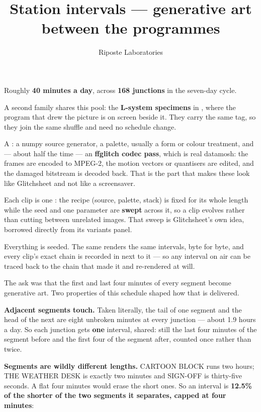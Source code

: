 \documentclass[fontpath=fonts/,logopath=logo/]{riposte-doc}
\title{Station intervals — generative art between the programmes}
\author{Riposte Laboratories}
\date{}
\begin{document}
\ripmakehead

\riptoc

Roughly \textbf{40 minutes a day}, across \textbf{168 junctions} in the seven-day cycle.

A second family shares this pool: the \textbf{L-system specimens} in , where the program that drew the picture is on screen beside it. They carry the same  tag, so they join the same shuffle and need no schedule change.



A : a numpy source generator, a palette, usually a form or colour treatment, and — about half the time — an \textbf{ffglitch codec pass}, which is real datamosh: the frames are encoded to MPEG-2, the motion vectors or quantisers are edited, and the damaged bitstream is decoded back. That is the part that makes these look like Glitchsheet and not like a screensaver.

Each clip is one : the recipe (source, palette, stack) is fixed for its whole length while the seed and one parameter are \textbf{swept} across it, so a clip evolves rather than cutting between unrelated images. That sweep is Glitchsheet's own idea, borrowed directly from its variants panel.

Everything is seeded. The same  renders the same intervals, byte for byte, and every clip's exact chain is recorded in  next to it — so any interval on air can be traced back to the chain that made it and re-rendered at will.



The ask was that the first and last four minutes of every segment become generative art. Two properties of this schedule shaped how that is delivered.

\textbf{Adjacent segments touch.} Taken literally, the tail of one segment and the head of the next are eight unbroken minutes at every junction — about 1.9 hours a day. So each junction gets \textbf{one} interval, shared: still the last four minutes of the segment before and the first four of the segment after, counted once rather than twice.

\textbf{Segments are wildly different lengths.} CARTOON BLOCK runs two hours; THE WEATHER DESK is exactly two minutes and SIGN-OFF is thirty-five seconds. A flat four minutes would erase the short ones. So an interval is \textbf{12.5\% of the shorter of the two segments it separates, capped at four minutes}:
\end{document}

